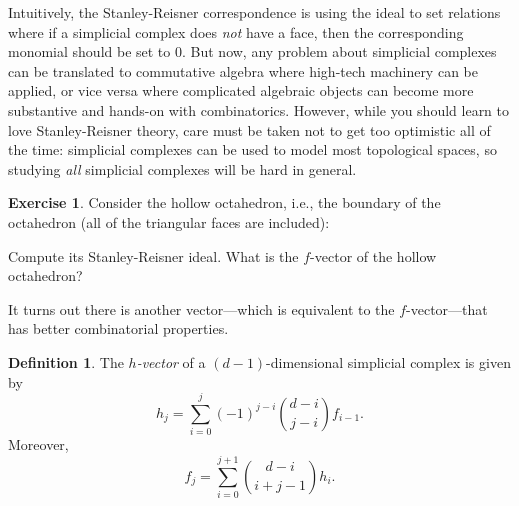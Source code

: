 \documentclass[12pt,a4paper]{article}
\theoremstyle{definition}
\newtheorem{definition}[theorem]{Definition}
\newtheorem{exercise}[theorem]{Exercise}
\numberwithin{equation}{section}
\begin{document}
Intuitively, the Stanley-Reisner correspondence is using the ideal to set relations where if a simplicial complex does \emph{not} have a face, then the corresponding monomial should be set to $0$.
But now, any problem about simplicial complexes can be translated to commutative algebra where high-tech machinery can be applied, or vice versa where complicated algebraic objects can become more substantive and hands-on with combinatorics.
However, while you should learn to love Stanley-Reisner theory, care must be taken not to get too optimistic all of the time: simplicial complexes can be used to model most topological spaces, so studying \emph{all} simplicial complexes will be hard in general.

\begin{exercise}
    \label{exercise:hollow octahedron}
    Consider the hollow octahedron, i.e., the boundary of the octahedron (all of the triangular faces are included):
    \begin{center}
    \end{center}
    Compute its Stanley-Reisner ideal. What is the $f$-vector of the hollow octahedron?
\end{exercise}

It turns out there is another vector---which is equivalent to the $f$-vector---that has better combinatorial properties.

\begin{definition}
    The \emph{$h$-vector} of a $(d-1)$-dimensional simplicial complex is given by
    \begin{equation*}
        h_j = \sum_{i=0}^j (-1)^{j-i} \binom{d-i}{j-i} f_{i-1}.
    \end{equation*}
    Moreover,
    \begin{equation*}
        f_j = \sum_{i=0}^{j+1} \binom{d-i}{i+j-1} h_i.
    \end{equation*}
\end{definition}
\end{document}
